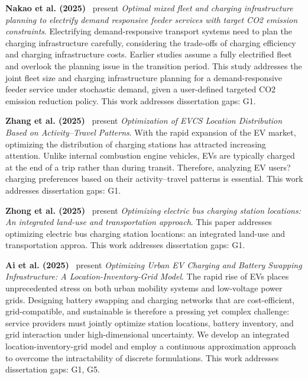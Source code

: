 \documentclass[letterpaper, 12pt, oneside, doublespacing]{Thesis}
\begin{document}
\noindent \textbf{Nakao et al. (2025)}~\cite{optimal_mixed_2025} present \textit{Optimal mixed fleet and charging infrastructure planning to electrify demand responsive feeder services with target CO2 emission constraints}. Electrifying demand-responsive transport systems need to plan the charging infrastructure carefully, considering the trade-offs of charging efficiency and charging infrastructure costs. Earlier studies assume a fully electrified fleet and overlook the planning issue in the transition period. This study addresses the joint fleet size and charging infrastructure planning for a demand-responsive feeder service under stochastic demand, given a user-defined targeted CO2 emission reduction policy. This work addresses dissertation gaps: G1.



\noindent \textbf{Zhang et al. (2025)}~\cite{optimization_of_2025} present \textit{Optimization of EVCS Location Distribution Based on Activity--Travel Patterns}. With the rapid expansion of the EV market, optimizing the distribution of charging stations has attracted increasing attention. Unlike internal combustion engine vehicles, EVs are typically charged at the end of a trip rather than during transit. Therefore, analyzing EV users? charging preferences based on their activity--travel patterns is essential. This work addresses dissertation gaps: G1.



\noindent \textbf{Zhong et al. (2025)}~\cite{optimizing_electric_2025} present \textit{Optimizing electric bus charging station locations: An integrated land-use and transportation approach}. This paper addresses optimizing electric bus charging station locations: an integrated land-use and transportation approa. This work addresses dissertation gaps: G1.



\noindent \textbf{Ai et al. (2025)}~\cite{optimizing_urban_2025} present \textit{Optimizing Urban EV Charging and Battery Swapping Infrastructure: A Location-Inventory-Grid Model}. The rapid rise of EVs places unprecedented stress on both urban mobility systems and low-voltage power grids. Designing battery swapping and charging networks that are cost-efficient, grid-compatible, and sustainable is therefore a pressing yet complex challenge: service providers must jointly optimize station locations, battery inventory, and grid interaction under high-dimensional uncertainty. We develop an integrated location-inventory-grid model and employ a continuous approximation approach to overcome the intractability of discrete formulations. This work addresses dissertation gaps: G1, G5.
\end{document}
